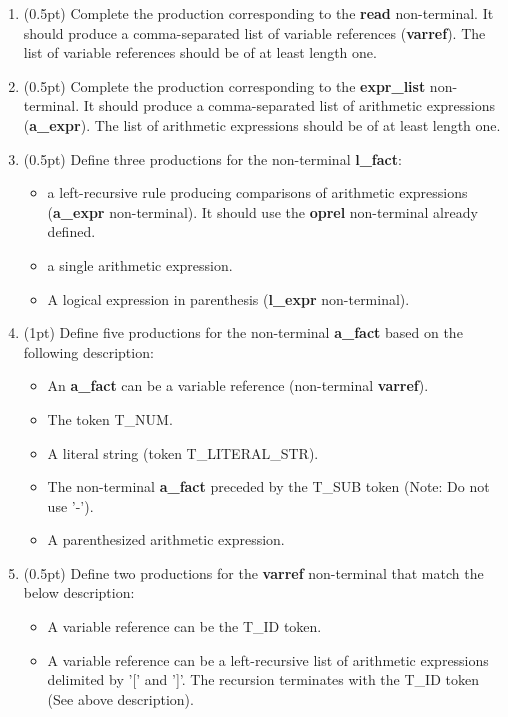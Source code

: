 \documentclass[letter,10pt]{article}
\begin{document}
\begin{enumerate}

\item (0.5pt)
Complete the production corresponding to the {\bf read} non-terminal. It should produce a comma-separated list of
variable references ({\bf varref}). The list of variable references should be of at least length one.

\item (0.5pt)
Complete the production corresponding to the {\bf expr\_list} non-terminal. It should produce a comma-separated list of
arithmetic expressions ({\bf a\_expr}). The list of arithmetic expressions should be of at least length one.

\item (0.5pt)
Define three productions for the non-terminal {\bf l\_fact}: 
  
  \begin{itemize}
  \item a left-recursive rule producing comparisons of arithmetic expressions ({\bf a\_expr} non-terminal). It should use the {\bf oprel} non-terminal already defined.
  \item a single arithmetic expression.
  \item A logical expression in parenthesis ({\bf l\_expr} non-terminal).
  \end{itemize}

\item (1pt)
Define five productions for the non-terminal {\bf a\_fact} based on the following description:

  \begin{itemize}
  \item An {\bf a\_fact} can be a variable reference (non-terminal {\bf varref}).
  \item The token T\_NUM.
  \item A literal string (token T\_LITERAL\_STR).
  \item The non-terminal {\bf a\_fact} preceded by the T\_SUB token (Note: Do not use '-').
  \item A parenthesized arithmetic expression.
  \end{itemize}

\item (0.5pt)
Define two productions for the {\bf varref} non-terminal that match the below description:

  \begin{itemize}
  \item A variable reference can be the T\_ID token.
  \item A variable reference can be a left-recursive list of arithmetic expressions delimited by '[' and ']'. The recursion terminates with the T\_ID token (See above description).
  \end{itemize}


\end{enumerate}
\end{document}
